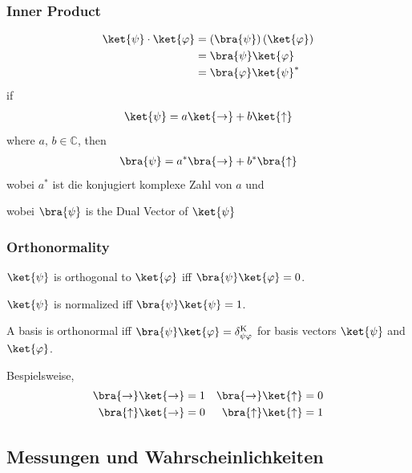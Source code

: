 \documentclass{beamer}
\begin{document}
\begin{frame}
\frametitle{Inner Product}
\begin{align*}
\ket{\psi} \cdot \ket{\varphi} &= \left(\bra{\psi}\right)\left(\ket{\varphi}\right) \\
&= \bra{\psi}\ket{\varphi} \\
&= \bra{\varphi}\ket{\psi}^*
\end{align*}
if
\begin{align*}
\ket{\psi} = a\ket{\rightarrow} + b\ket{\uparrow}
\end{align*}
where $a,\,b\in\mathbb{C}$, then
\begin{align*}
\bra{\psi} = a^*\bra{\rightarrow} + b^*\bra{\uparrow}
\end{align*}
wobei $a^*$ ist die konjugiert komplexe Zahl von $a$ und

wobei $\bra{\psi}$ is the Dual Vector of $\ket{\psi}$
\end{frame}

\begin{frame}
\frametitle{Orthonormality}
$\ket{\psi}$ is orthogonal to $\ket{\varphi}$ iff $\bra{\psi}\ket{\varphi} = 0$.

\bigskip

$\ket{\psi}$ is normalized iff $\bra{\psi}\ket{\psi} = 1$.

\bigskip

A basis is orthonormal iff $\bra{\psi}\ket{\varphi} = \delta_{\psi\varphi}^\mathrm{K}$ for basis vectors $\ket{\psi}$ and $\ket{\varphi}$.

\bigskip

Bespielsweise,
\begin{align*}
\bra{\rightarrow}\ket{\rightarrow} &= 1 &
\bra{\rightarrow}\ket{\uparrow} &= 0 \\
\bra{\uparrow}\ket{\rightarrow} &= 0 &
\bra{\uparrow}\ket{\uparrow} &= 1
\end{align*}
\end{frame}


\subsection{Messungen und Wahrscheinlichkeiten}
\end{document}
